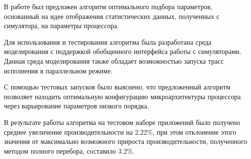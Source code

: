 В работе был предложен алгоритм оптимального подбора параметров, основанный на идее отображения статистических данных, полученных с симулятора, на параметры процессора.

Для использования и тестирования алгоритма была разработана среда моделирования с поддержкой обобщенного интерфейса работы с симуляторами. Данная среда моделирования также обладает возможностью запуска трасс исполнения в параллельном режиме.

С помощью тестовых запусков было выяснено, что предложенный алгоритм позволяет находить оптимальную конфигурацию микроархитектуры процессора через варьирование параметров низкого порядка.

В результате работы алгоритма на тестовом наборе приложений было получено среднее увеличение производительности на 2.22\%, при этом отклонение этого значения от максимально возможного прироста производительности, полученного методом полного перебора, составило 3.2\%.
